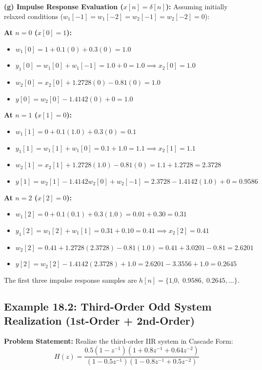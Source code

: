\documentclass[11pt,a4paper]{article}
\begin{document}
\noindent\textbf{(g) Impulse Response Evaluation ($x[n] = \delta[n]$):}
Assuming initially relaxed conditions ($w_1[-1] = w_1[-2] = w_2[-1] = w_2[-2] = 0$):

\textbf{At $n = 0$ ($x[0] = 1$):}
\begin{itemize}
    \item $w_1[0] = 1 + 0.1(0) + 0.3(0) = \mathbf{1.0}$
    \item $y_1[0] = w_1[0] + w_1[-1] = 1.0 + 0 = \mathbf{1.0} \implies x_2[0] = 1.0$
    \item $w_2[0] = x_2[0] + 1.2728(0) - 0.81(0) = \mathbf{1.0}$
    \item $y[0] = w_2[0] - 1.4142(0) + 0 = \mathbf{1.0}$
\end{itemize}

\textbf{At $n = 1$ ($x[1] = 0$):}
\begin{itemize}
    \item $w_1[1] = 0 + 0.1(1.0) + 0.3(0) = \mathbf{0.1}$
    \item $y_1[1] = w_1[1] + w_1[0] = 0.1 + 1.0 = \mathbf{1.1} \implies x_2[1] = 1.1$
    \item $w_2[1] = x_2[1] + 1.2728(1.0) - 0.81(0) = 1.1 + 1.2728 = \mathbf{2.3728}$
    \item $y[1] = w_2[1] - 1.4142 w_2[0] + w_2[-1] = 2.3728 - 1.4142(1.0) + 0 = \mathbf{0.9586}$
\end{itemize}

\textbf{At $n = 2$ ($x[2] = 0$):}
\begin{itemize}
    \item $w_1[2] = 0 + 0.1(0.1) + 0.3(1.0) = 0.01 + 0.30 = \mathbf{0.31}$
    \item $y_1[2] = w_1[2] + w_1[1] = 0.31 + 0.10 = \mathbf{0.41} \implies x_2[2] = 0.41$
    \item $w_2[2] = 0.41 + 1.2728(2.3728) - 0.81(1.0) = 0.41 + 3.0201 - 0.81 = \mathbf{2.6201}$
    \item $y[2] = w_2[2] - 1.4142(2.3728) + 1.0 = 2.6201 - 3.3556 + 1.0 = \mathbf{0.2645}$
\end{itemize}
The first three impulse response samples are $h[n] = \{ \underline{1.0}, \; 0.9586, \; 0.2645, \dots \}$.

\vspace{0.4cm}
\subsection{Example 18.2: Third-Order Odd System Realization (1st-Order + 2nd-Order)}
\textbf{Problem Statement:} Realize the third-order IIR system in Cascade Form:
\begin{equation}
H(z) = \frac{0.5 (1 - z^{-1})(1 + 0.8 z^{-1} + 0.64 z^{-2})}{(1 - 0.5 z^{-1})(1 - 0.8 z^{-1} + 0.5 z^{-2})}
\end{equation}
\end{document}
